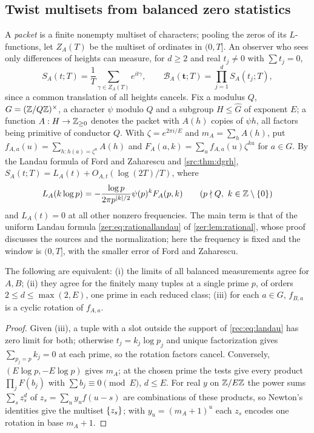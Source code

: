 \subsection{Twist multisets from balanced zero statistics}\label{rec:sec:homometry}

A \emph{packet} is a finite nonempty multiset of characters; pooling the zeros of its $L$-functions,
let $Z_A(T)$ be the multiset of ordinates in $(0,T]$. An observer who sees only differences of
heights can measure, for $d\ge2$ and real $t_j\ne0$ with $\sum t_j=0$,
\[
 S_A(t;T)=\frac1T\sum_{\gamma\in Z_A(T)}e^{it\gamma},\qquad \mathcal B_A(\mathbf t;T)=\prod_{j=1}^dS_A(t_j;T),
\]
since a common translation of all heights cancels. Fix a modulus $Q$, $G=(\mathbb{Z}/Q\mathbb{Z})^\times$, a character
$\psi$ modulo $Q$ and a subgroup $H\le\widehat G$ of exponent $E$; a function $A:H\to\mathbb{Z}_{\ge0}$ denotes the
packet with $A(h)$ copies of $\psi h$, all factors being primitive of conductor $Q$. With
$\zeta=e^{2\pi i/E}$ and $m_A=\sum_hA(h)$, put
$f_{A,a}(u)=\sum_{h:h(a)=\zeta^u}A(h)$ and $F_A(a,k)=\sum_uf_{A,a}(u)\zeta^{ku}$ for $a\in G$. By the
Landau formula of Ford and Zaharescu \cite[Lemma~2.1]{FordZaharescu2015Unnormalized} and
\cref{src:thm:dgrh}, $S_A(t;T)=L_A(t)+O_{A,t}(\log(2T)/T)$, where
\begin{equation}\label{rec:eq:landau}
 L_A(k\log p)=-\frac{\log p}{2\pi p^{\lvert k\rvert/2}}\psi(p)^kF_A(p,k)\qquad(p\nmid Q,\ k\in\mathbb{Z}\setminus\{0\})
\end{equation}
and $L_A(t)=0$ at all other nonzero frequencies. The main term is that of the uniform Landau formula
\eqref{zer:eq:rationallandau} of \cref{zer:lem:rational}, whose proof discusses the sources and the
normalization; here the frequency is fixed and the window is $(0,T]$, with the smaller error of Ford and
Zaharescu.

\begin{theorem}\label{rec:thm:localclass}
The following are equivalent: \textup{(i)} the limits of all balanced measurements agree for $A,B$;
\textup{(ii)} they agree for the finitely many tuples at a single prime $p$, of orders
$2\le d\le\max(2,E)$, one prime in each reduced class; \textup{(iii)} for each $a\in G$, $f_{B,a}$ is a
cyclic rotation of $f_{A,a}$.
\end{theorem}

\begin{proof}
Given (iii), a tuple with a slot outside the support of \eqref{rec:eq:landau} has zero limit for both;
otherwise $t_j=k_j\log p_j$ and unique factorization gives $\sum_{p_j=p}k_j=0$ at each prime, so the
rotation factors cancel. Conversely, $(E\log p,-E\log p)$ gives $m_A$; at the chosen prime the tests
give every product $\prod_jF(b_j)$ with $\sum b_j\equiv0\pmod E$, $d\le E$. For real $y$ on $\mathbb{Z}/E\mathbb{Z}$ the
power sums $\sum_sz_s^d$ of $z_s=\sum_uy_uf(u-s)$ are combinations of these products, so Newton's
identities give the multiset $\{z_s\}$; with $y_u=(m_A+1)^u$ each $z_s$ encodes one rotation in base
$m_A+1$.
\end{proof}

